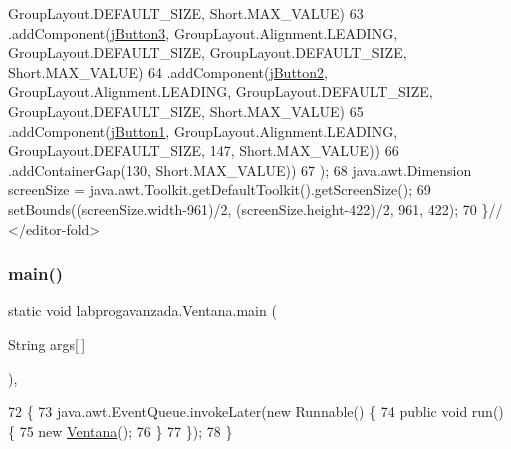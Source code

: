 \begin{DoxyCode}
      GroupLayout.DEFAULT\_SIZE, Short.MAX\_VALUE)
63                    .addComponent(\mbox{\hyperlink{classlabprogavanzada_1_1_ventana_af4bec17d2ee089325b41954139e9979b}{jButton3}}, GroupLayout.Alignment.LEADING, GroupLayout.DEFAULT\_SIZE,
       GroupLayout.DEFAULT\_SIZE, Short.MAX\_VALUE)
64                    .addComponent(\mbox{\hyperlink{classlabprogavanzada_1_1_ventana_a33d2405f9bf4b2f5b095e92ad78de78d}{jButton2}}, GroupLayout.Alignment.LEADING, GroupLayout.DEFAULT\_SIZE,
       GroupLayout.DEFAULT\_SIZE, Short.MAX\_VALUE)
65                    .addComponent(\mbox{\hyperlink{classlabprogavanzada_1_1_ventana_aaefd42529d112e472936e52efb94ae50}{jButton1}}, GroupLayout.Alignment.LEADING, GroupLayout.DEFAULT\_SIZE,
       147, Short.MAX\_VALUE))
66                 .addContainerGap(130, Short.MAX\_VALUE))
67         );
68         java.awt.Dimension screenSize = java.awt.Toolkit.getDefaultToolkit().getScreenSize();
69         setBounds((screenSize.width-961)/2, (screenSize.height-422)/2, 961, 422);
70     \}\textcolor{comment}{// </editor-fold>}
\end{DoxyCode}
\mbox{\label{classlabprogavanzada_1_1_ventana_ac83004124b33aa67c70a33d1f7a274f4}} 
\subsubsection{\texorpdfstring{main()}{main()}}
{\footnotesize\ttfamily static void labprogavanzada.\+Ventana.\+main (\begin{DoxyParamCaption}\item[{String}]{args\mbox{[}$\,$\mbox{]} }\end{DoxyParamCaption})\hspace{0.3cm}{\ttfamily [inline]}, {\ttfamily [static]}}


\begin{DoxyCode}
72                                            \{
73         java.awt.EventQueue.invokeLater(\textcolor{keyword}{new} Runnable() \{
74             \textcolor{keyword}{public} \textcolor{keywordtype}{void} run() \{
75                 \textcolor{keyword}{new} \mbox{\hyperlink{classlabprogavanzada_1_1_ventana_a319001fd51267e1ec98672374cb2b2ca}{Ventana}}();
76             \}
77         \});
78     \}
\end{DoxyCode}



